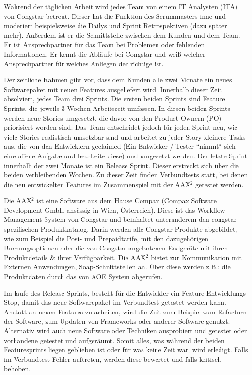 \documentclass[11pt,a4paper]{article} %
\begin{document}
Während der täglichen Arbeit wird jedes Team von einem IT Analysten (ITA) von Congstar betreut. Dieser hat die Funktion des Scrummasters inne und moderiert beispielsweise die Dailys und Sprint Retrospektiven (dazu später mehr). Außerdem ist er die Schnittstelle zwischen dem Kunden und dem Team. Er ist Ansprechpartner für das Team bei Problemen oder fehlenden Informationen. Er kennt die Abläufe bei Congstar und weiß welcher Ansprechpartner für welches Anliegen der richtige ist.

Der zeitliche Rahmen gibt vor, dass dem Kunden alle zwei Monate ein neues Softwarepaket mit neuen Features ausgeliefert wird.
Innerhalb dieser Zeit absolviert, jedes Team drei Sprints. Die ersten beiden Sprints sind Feature Sprints,
die jeweils 3 Wochen Arbeitszeit umfassen. In diesen beiden Sprints werden neue Stories umgesetzt,
die davor von den Product Ownern (PO) priorisiert worden sind. Das Team
entscheidet jedoch für jeden Sprint neu, wie viele Stories realistisch umsetzbar sind und arbeitet zu jeder Story kleinere Tasks aus,
die von den Entwicklern geclaimed (Ein Entwicker / Tester “nimmt“ sich eine offene Aufgabe und bearbeite diese) und umgesetzt werden. Der letzte Sprint innerhalb der zwei Monate ist ein Release Sprint.
Dieser erstreckt sich über die beiden verbleibenden Wochen.
Zu dieser Zeit finden Verbundtests statt, bei denen die neu entwickelten Features im Zusammenspiel mit der AAX$^{2}$ getestet werden.


\par
\begingroup
\leftskip=1cm %
\noindent Die AAX$^{2}$ ist eine Software aus dem Hause Compax (Compax Software Development GmbH ansässig in Wien, Österreich). Diese ist das Workflow-Management-System von Congstar und beinhaltet unteranderem den congstar-spezifischen Produktkatalog.
Darin werden alle Congstar Produkte abgebildet, wie zum Beispiel die Post- und
Prepaidtarife, mit den dazugehörigen Buchungsoptionen oder die von Congstar angebotenen Endgeräte mit ihren Produktdetails  \& ihrer Verfügbarkeit.
Die AAX$^{2}$ bietet zur Kommunikation mit Externen Anwendungen, Soap-Schnittstellen an. Über diese werden z.B.: die Produktdaten durch das von AOE System abgerufen.\cite{cx}
\par
\endgroup

Im laufe des Release Sprints, besteht für die Entwickler ein Feature-Entwicklungs-Stop, damit das neue Softwarepaket im Verbundtest getestet werden kann.
Anstatt an neuen Features zu arbeiten, wird die Zeit zum Beispiel zum Refactorn der Software, zum Updaten von Frameworks oder anderer Software genutzt. Alternativ wird auch neue Software oder Techniken ausprobiert und getestet oder vorhandene getestet und aufgeräumt.
Somit alles, was während der beiden Featuresprints liegen geblieben ist oder für was keine Zeit war, wird erledigt. Falls im Verbundtest Fehler auftreten, werden diese bewertet und falls kritisch behoben.
\end{document}

